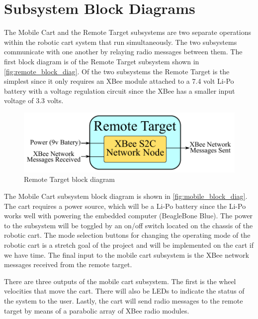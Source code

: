 \section{Subsystem Block Diagrams}
The Mobile Cart and the Remote Target subsystems are two separate operations within the robotic cart system that run simultaneously. The two subsystems communicate with one another by relaying radio messages between them. The first block diagram is of the Remote Target subsystem shown in \autoref{fig:remote_block_diag}. Of the two subsystems the Remote Target is the simplest since it only requires an XBee module attached to a 7.4 volt Li-Po battery with a voltage regulation circuit since the XBee has a smaller input voltage of 3.3 volts.

\begin{figure}[h!]
  \centering
  \includegraphics[scale=0.9]{figs/remote_target_block_diagram}
  \caption{Remote Target block diagram}
  \label{fig:remote_block_diag}
\end{figure}

\vspace*{12pt}
\noindent
The Mobile Cart subsystem block diagram is shown in \autoref{fig:mobile_block_diag}. The cart requires a power source, which will be a Li-Po battery since the Li-Po works well with powering the embedded computer (BeagleBone Blue). The power to the subsystem will be toggled by an on/off switch located on the chassis of the robotic cart. The mode selection buttons for changing the operating mode of the robotic cart is a stretch goal of the project and will be implemented on the cart if we have time. The final input to the mobile cart subsystem is the XBee network messages received from the remote target.

\vspace*{12pt}
\noindent
There are three outputs of the mobile cart subsystem. The first is the wheel velocities that move the cart. There will also be LEDs to indicate the status of the system to the user. Lastly, the cart will send radio messages to the remote target by means of a parabolic array of XBee radio modules.

